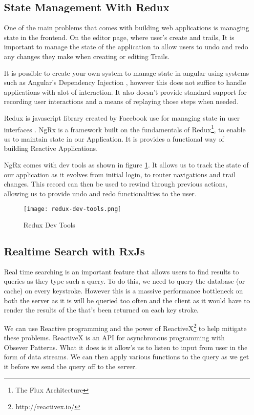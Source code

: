 \subsection{State Management With Redux}
One of the main problems that comes with building web applications is managing state in the frontend. On the editor page, where user's create and trails, It is important to manage the state of the application to allow users to undo and redo any changes they make when creating or editing Trails.

It is possible to create your own system to manage state in angular using systems such as Angular's Dependency Injection \cite{wiki:DependencyInjection}, however this does not suffice to handle applications with alot of interaction. It also doesn't provide standard support for recording user interactions and a means of replaying those steps when needed.

Redux is javascript library created by Facebook use for managing state in user interfaces \cite{wiki:Redux}. NgRx \cite{cheng2018state} is a framework built on the fundamentals of Redux\footnote{The Flux Architecture}, to enable us to maintain state in our Application. It is provides a functional way of building Reactive Applications.

NgRx comes with dev tools as shown in figure \ref{fig:reduxDevTools}. It allows us to track the state of our application as it evolves from initial login, to router navigations and trail changes. This record can then be used to rewind through previous actions, allowing us to provide undo and redo functionalities to the user.
\begin{figure}[ht]
    \centering
    \texttt{[image: redux-dev-tools.png]}
    \caption{Redux Dev Tools}
    \label{fig:reduxDevTools}
\end{figure}

\subsection{Realtime Search with RxJs}
Real time searching is an important feature that allows users to find results to queries as they type such a query. To do this, we need to query the database (or cache) on every keystroke. However this is a massive performance bottleneck on both the server as it is will be queried too often and the client as it would have to render the results of the that's been returned on each key stroke.

We can use Reactive programming and the power of ReactiveX\footnote{http://reactivex.io/} to help mitigate these problems. ReactiveX is an API for asynchronous programming with Obsever Patterns. What it does is it allow's us to listen to input from user in the form of data streams. We can then apply various functions to the query as we get it before we send the query off to the server. 

